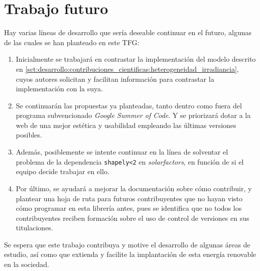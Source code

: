 \section{Trabajo futuro} \label{sct:resultados:trabajofuturo}

Hay varias líneas de desarrollo que sería deseable continuar en el futuro, algunas de las cuales se han planteado en este TFG:

\begin{enumerate}
    \item Inicialmente se trabajará en contrastar la implementación del modelo descrito en \ref{sct:desarrollo:contribuciones_cientificas:heterogeneidad_irradiancia}, cuyos autores solicitan y facilitan información para contrastar la implementación con la suya.
    \item Se continuarán las propuestas ya planteadas, tanto dentro como fuera del programa subvencionado \textit{Google Summer of Code}. Y se priorizará dotar a la web de una mejor estética y usabilidad empleando las últimas versiones posibles.
    \item Además, posiblemente se intente continuar en la línea de solventar el problema de la dependencia \texttt{shapely<2} en \textit{solarfactors}, en función de si el equipo decide trabajar en ello.
    \item Por último, se ayudará a mejorar la documentación sobre cómo contribuir, y plantear una hoja de ruta para futuros contribuyentes que no hayan visto cómo programar en esta librería antes, pues se identifica que no todos los contribuyentes reciben formación sobre el uso de control de versiones en sus titulaciones.
\end{enumerate}

Se espera que este trabajo contribuya y motive el desarrollo de algunas áreas de estudio, así como que extienda y facilite la implantación de esta energía renovable en la sociedad.
